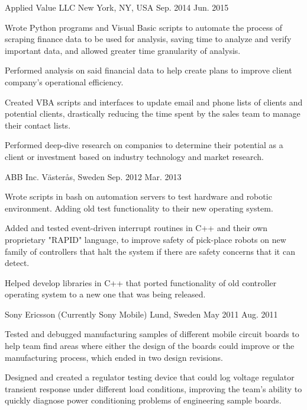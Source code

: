 \begin{cventries}
        {Applied Value LLC}
        {New York, NY, USA}
        {Sep. 2014 \- Jun. 2015}
        {\begin{cvitems}
            \item{Wrote Python programs and Visual Basic scripts to automate the process of scraping finance data to be used for analysis, saving time to analyze and verify important data, and allowed greater time granularity of analysis.}
            \item{Performed analysis on said financial data to help create plans to improve client company's operational efficiency.}
            \item{Created VBA scripts and interfaces to update email and phone lists of clients and potential clients, drastically reducing the time spent by the sales team to manage their contact lists.}
            \item{Performed deep-dive research on companies to determine their potential as a client or investment based on industry technology and market research.}
            \end{cvitems}
        }
        {ABB Inc.}
        {Västerås, Sweden}
        {Sep. 2012 \- Mar. 2013}
        {\begin{cvitems}
            \item{Wrote scripts in bash on automation servers to test hardware and robotic environment. Adding old test functionality to their new operating system.}
            \item{Added and tested event-driven interrupt routines in C++ and their own proprietary "RAPID" language, to improve safety of pick-place robots on new family of controllers that halt the system if there are safety concerns that it can detect.}
            \item{Helped develop libraries in C++ that ported functionality of old controller operating system to a new one that was being released.}
            \end{cvitems}
        }

        {Sony Ericsson (Currently Sony Mobile)}
        {Lund, Sweden}
        {May 2011 \- Aug. 2011}
        {\begin{cvitems}
            \item{Tested and debugged manufacturing samples of different mobile circuit boards to help team find areas where either the design of the boards could improve or the manufacturing process, which ended in two design revisions.}
            \item{Designed and created a regulator testing device that could log voltage regulator transient response under different load conditions, improving the team's ability to quickly diagnose power conditioning problems of engineering sample boards.}
            \end{cvitems}
        }


\end{cventries}
